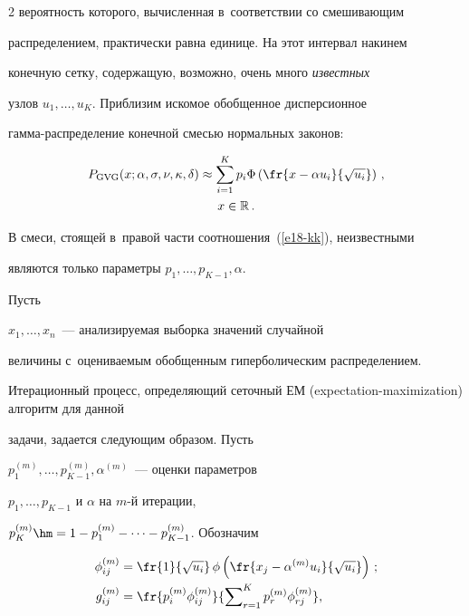 \begin{multicols}{2}
вероятность которого, вычисленная в~соответствии со смешивающим


распределением, практически равна единице. На этот интервал накинем


конечную сетку, содержащую, возможно, очень много {\it известных}


узлов $u_1,\ldots,u_K$. Приблизим искомое обобщенное дисперсионное


гам\-ма-рас\-пре\-де\-ле\-ние конечной смесью нормальных законов:


\begin{multline}


P_{\mathrm{GVG}}(x;\alpha,\sigma,\nu,\kappa,\delta)\approx


\sum_{i=1}^Kp_i\Phi\left(\fr{x-\alpha


u_i}{\sqrt{u_i}}\right)\,,\\


 x\in\mathbb{R}\,.\label{e18-kk}


\end{multline}


В смеси, стоящей в~правой части соотношения~(\ref{e18-kk}), неизвестными


являются только па\-ра\-мет\-ры $p_1,\ldots,p_{K-1},\alpha$. 





Пусть


$x_1,\ldots,x_n$~--- анализируемая выборка значений случайной


величины с~оценива\-емым обобщенным гиперболическим распределением.


Итерационный процесс, определяющий сеточный ЕМ (expectation-maximization) ал\-го\-ритм для данной


задачи, задается следующим образом. Пусть


$p_1^{(m)},\ldots,p_{K-1}^{(m)}, \alpha^{(m)}$~--- оценки параметров


$p_1,\ldots,p_{K-1}$ и $\alpha$ на $m$-й итерации,


$p_K^{(m)}\hm=1-p_1^{(m)}-\cdots-p_{K-1}^{(m)}$. Обозначим


\begin{align*}


\phi_{ij}^{(m)}&=\fr{1}{\sqrt{u_i}}\,\phi\left(\fr{x_j-\alpha^{(m)}u_i}{\sqrt{u_i}}\right)\,;\\


g_{ij}^{(m)}&=\fr{p_i^{(m)}\phi_{ij}^{(m)}}


{\sum\nolimits_{r=1}^Kp_r^{(m)}\phi_{rj}^{(m)}},\



\end{align*}
\end{multicols}
